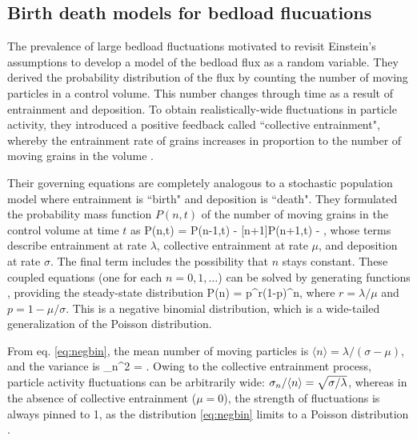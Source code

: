 \subsection{Birth death models for bedload flucuations}

The prevalence of large bedload fluctuations motivated \citet{Ancey2006,Ancey2008} to revisit Einstein's assumptions to develop a model of the bedload flux as a random variable.
They derived the probability distribution of the flux by counting the number of moving particles in a control volume. 
This number changes through time as a result of entrainment and deposition.
To obtain realistically-wide fluctuations in particle activity, they introduced a positive feedback called ``collective entrainment", whereby the entrainment rate of grains increases in proportion to the number of moving grains in the volume \citep{Ancey2008,Heyman2013}.

Their governing equations are completely analogous to a stochastic population model \citep{Cox1965, Pielou1977} where entrainment is ``birth" and deposition is ``death".
They formulated the probability mass function $P(n,t)$ of the number of moving grains in the control volume at time $t$ as
\be \pt P(n,t) =  P(n-1,t) - [n+1]\sigma P(n+1,t) - ,\ee
whose terms describe entrainment at rate $\lambda$, collective entrainment at rate $\mu$, and deposition at rate $\sigma$. 
The final term includes the possibility that $n$ stays constant.
These coupled equations (one for each $n=0,1,\dots$) can be solved by generating functions \citep{Cox1965,Ancey2008}, providing the steady-state distribution
\be P(n) = p^r(1-p)^n, \label{eq:negbin}\ee
where $r = \lambda/\mu$ and $p = 1-\mu/\sigma$.
This is a negative binomial distribution, which is a wide-tailed generalization of the Poisson distribution. 

From eq. \ref{eq:negbin}, the mean number of moving particles is $\langle n \rangle = \lambda/(\sigma-\mu)$, and the variance is
\be \sigma_n^2 = . \ee
Owing to the collective entrainment process, particle activity fluctuations can be arbitrarily wide: $\sigma_n/\langle n \rangle = \sqrt{\sigma/\lambda}$, whereas in the absence of collective entrainment ($\mu=0$), the strength of fluctuations is always pinned to 1, as the distribution \ref{eq:negbin} limits to a Poisson distribution \citep{Ancey2006}.

